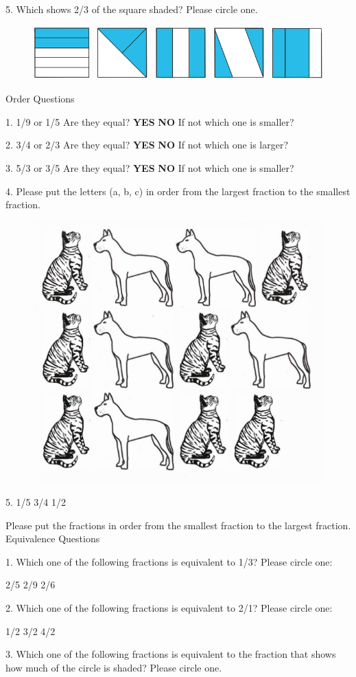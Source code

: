 \documentclass[11.5pt]{sig-alternate} %
\begin{document}
5. Which shows 2/3 of the square shaded? Please circle one.

\begin{figure}[h]
    \centering
    \includegraphics[width=0.5\linewidth]{images/a5.png}
\end{figure}
\clearpage
Order Questions

1. 1/9 or 1/5 Are they equal? \textbf{YES} \textbf{NO} If not which one is smaller?

2. 3/4 or 2/3 Are they equal? \textbf{YES} \textbf{NO} If not which one is larger?

3. 5/3 or 3/5 Are they equal? \textbf{YES} \textbf{NO} If not which one is smaller?

4. Please put the letters (a, b, c) in order from the largest fraction to the smallest fraction.

\begin{figure}[h]
    \centering
    \includegraphics[width=0.5\linewidth]{images/a4.png}
\end{figure}

5. 1/5 3/4 1/2

Please put the fractions in order from the smallest fraction to the largest fraction.
\clearpage
Equivalence Questions

1. Which one of the following fractions is equivalent to 1/3? Please circle one:

2/5 2/9 2/6

2. Which one of the following fractions is equivalent to 2/1? Please circle one:

1/2 3/2 4/2

3. Which one of the following fractions is equivalent to the fraction that shows how much of the circle is shaded? Please circle one.
\end{document}
